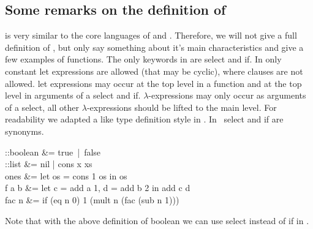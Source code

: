 \subsection{Some remarks on the definition of \Sapl}
\Sapl is very similar to the core languages of \Haskell and \Clean. 
Therefore, we will not give a full definition of \Sapl, but only say something about it's main characteristics
and give a few examples of \Sapl functions.
The only keywords in \Sapl are \textsf{select} and \textsf{if}.
In \Sapl only constant \textsf{let} expressions are allowed (that may be cyclic), \textsf{where} clauses are not allowed.
\textsf{let} expressions may occur at the top level in a function and at the top level in  arguments of a  \textsf{select} and \textsf{if}.
$\lambda$-expressions may only occur as arguments of a \textsf{select}, all other $\lambda$-expressions should be lifted to the main
level. 
For readability we adapted a \Clean like type definition style in \Sapl. 
In \Sapl\  \textsf{select} and \textsf{if} are synonyms. 
\begin{haskell}
::boolean &= true\ |\ false\\
::list &= nil | cons x xs\\
ones &= let os = cons 1 os in os \\
f a b &= let c = add a 1, d = add b 2 in add c d\\
fac n &= if (eq n 0) 1 (mult n (fac (sub n 1)))
\end{haskell}\normalsize
Note that with the above definition of boolean we can use \textsf{select} instead of \textsf{if} in \Sapl. 




